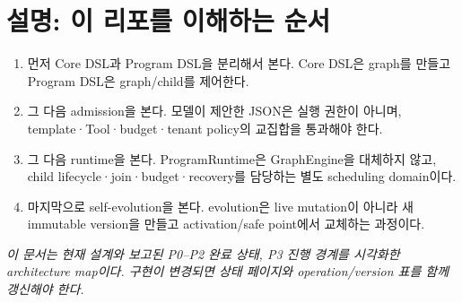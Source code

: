 \documentclass[a4paper,landscape]{article}
\begin{document}
\section*{설명: 이 리포를 이해하는 순서}
\begin{enumerate}[leftmargin=18mm,itemsep=2pt]
\item 먼저 Core DSL과 Program DSL을 분리해서 본다. Core DSL은 graph를 만들고 Program DSL은 graph/child를 제어한다.
\item 그 다음 admission을 본다. 모델이 제안한 JSON은 실행 권한이 아니며, template·Tool·budget·tenant policy의 교집합을 통과해야 한다.
\item 그 다음 runtime을 본다. ProgramRuntime은 GraphEngine을 대체하지 않고, child lifecycle·join·budget·recovery를 담당하는 별도 scheduling domain이다.
\item 마지막으로 self-evolution을 본다. evolution은 live mutation이 아니라 새 immutable version을 만들고 activation/safe point에서 교체하는 과정이다.
\end{enumerate}

\vfill
\begin{center}\small\textit{이 문서는 현재 설계와 보고된 P0--P2 완료 상태, P3 진행 경계를 시각화한 architecture map이다. 구현이 변경되면 상태 페이지와 operation/version 표를 함께 갱신해야 한다.}\end{center}
\end{document}
